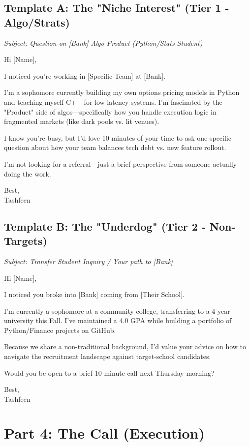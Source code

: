 \documentclass[11pt, a4paper]{article}
\begin{document}
\subsection{Template A: The "Niche Interest" (Tier 1 - Algo/Strats)}
\textit{Subject: Question on [Bank] Algo Product (Python/Stats Student)}

Hi [Name],

I noticed you’re working in [Specific Team] at [Bank].

I’m a sophomore currently building my own options pricing models in Python and teaching myself C++ for low-latency systems. I’m fascinated by the "Product" side of algos—specifically how you handle execution logic in fragmented markets (like dark pools vs. lit venues).

I know you’re busy, but I’d love 10 minutes of your time to ask one specific question about how your team balances tech debt vs. new feature rollout.

I’m not looking for a referral—just a brief perspective from someone actually doing the work.

Best, \\
Tashfeen

\subsection{Template B: The "Underdog" (Tier 2 - Non-Targets)}
\textit{Subject: Transfer Student Inquiry / Your path to [Bank]}

Hi [Name],

I noticed you broke into [Bank] coming from [Their School].

I’m currently a sophomore at a community college, transferring to a 4-year university this Fall. I’ve maintained a 4.0 GPA while building a portfolio of Python/Finance projects on GitHub.

Because we share a non-traditional background, I’d value your advice on how to navigate the recruitment landscape against target-school candidates.

Would you be open to a brief 10-minute call next Thursday morning?

Best, \\
Tashfeen

\section{Part 4: The Call (Execution)}
\end{document}
